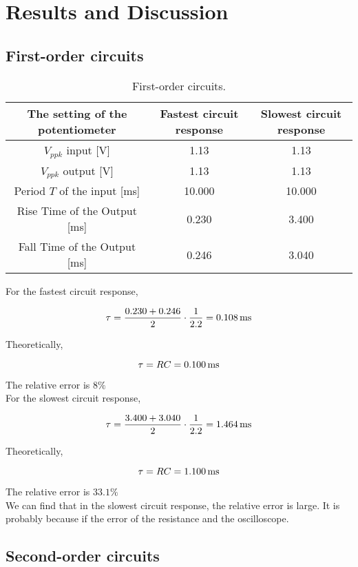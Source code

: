 \documentclass{article}
\begin{document}
\section{Results and Discussion}

\subsection{First-order circuits}

\begin{table}[!h]
\begin{center}
\begin{tabular}{|c|c|c|}
\hline
The setting of the potentiometer  & Fastest circuit response & Slowest circuit response \\
\hline
$V_{ppk}$ input [V]		&	1.13	&	1.13	\\
\hline
$V_{ppk}$ output [V]	&	1.13	&	1.13	\\
\hline
Period $T$ of the input [ms]	&	10.000	&	10.000	\\
\hline
Rise Time of the Output [ms]	&	0.230	&	3.400	\\
\hline
Fall Time of the Output [ms]	&	0.246	&	3.040	\\
\hline
\end{tabular}
\caption{First-order circuits.}
\label{tab-1}
\end{center}
\end{table}

For the fastest circuit response,

$$\tau=\frac{0.230+0.246}{2}\cdot\frac{1}{2.2}=0.108\,\rm{ms}$$

Theoretically,

$$\tau=RC=0.100\,\rm{ms}$$

The relative error is $8\%$\\

For the slowest circuit response,

$$\tau=\frac{3.400+3.040}{2}\cdot\frac{1}{2.2}=1.464\,\rm{ms}$$

Theoretically,

$$\tau=RC=1.100\,\rm{ms}$$

The relative error is $33.1\%$\\

We can find that in the slowest circuit response, the relative error is large. It is probably because if the error of the resistance and the oscilloscope.

\subsection{Second-order circuits}
\end{document}
